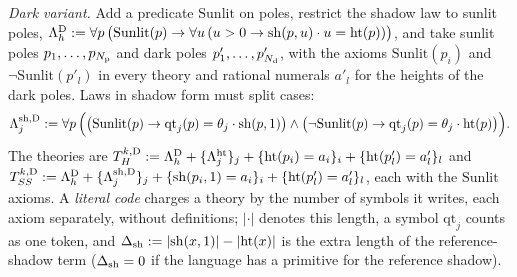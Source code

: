 \emph{Dark variant.} Add a predicate $\mathrm{Sunlit}$ on poles, restrict the shadow law to sunlit poles, $\Lambda^{\rm D}_h:=\forall p\,\big(\mathrm{Sunlit}(p)\to\forall u\,(u>0\to\mathrm{sh}(p,u)\cdot u=\mathrm{ht}(p))\big)$, and take sunlit poles $p_1,\dots,p_{N_{\rm p}}$ and dark poles $p'_1,\dots,p'_{N_{\rm d}}$, with the axioms $\mathrm{Sunlit}(p_i)$ and $\neg\mathrm{Sunlit}(p'_l)$ in every theory and rational numerals $a'_l$ for the heights of the dark poles. Laws in shadow form must split cases:
\[
\Lambda^{\rm sh,D}_j:=\forall p\,\Big(\big(\mathrm{Sunlit}(p)\to\mathrm{qt}_j(p)=\theta_j\cdot\mathrm{sh}(p,1)\big)\wedge\big(\neg\mathrm{Sunlit}(p)\to\mathrm{qt}_j(p)=\theta_j\cdot\mathrm{ht}(p)\big)\Big).
\]
The theories are $T^{k,\rm D}_H:=\Lambda^{\rm D}_h+\{\Lambda^{\rm ht}_j\}_j+\{\mathrm{ht}(p_i)=a_i\}_i+\{\mathrm{ht}(p'_l)=a'_l\}_l$ and $T^{k,\rm D}_{SS}:=\Lambda^{\rm D}_h+\{\Lambda^{\rm sh,D}_j\}_j+\{\mathrm{sh}(p_i,1)=a_i\}_i+\{\mathrm{ht}(p'_l)=a'_l\}_l$, each with the $\mathrm{Sunlit}$ axioms. A \emph{literal code} charges a theory by the number of symbols it writes, each axiom separately, without definitions; $\lvert\cdot\rvert$ denotes this length, a symbol $\mathrm{qt}_j$ counts as one token, and $\Delta_{\rm sh}:=\lvert\mathrm{sh}(x,1)\rvert-\lvert\mathrm{ht}(x)\rvert$ is the extra length of the reference-shadow term ($\Delta_{\rm sh}=0$ if the language has a primitive for the reference shadow).

